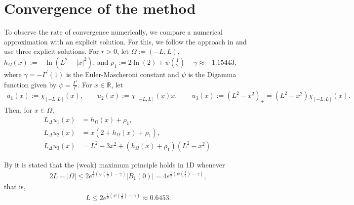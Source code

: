 \documentclass[11 pt]{article}
\numberwithin{equation}{section}
\def\R{\mathbb{R}}
\begin{document}
\section{Convergence of the method}

To observe the rate of convergence numerically, we compare a numerical approximation with an explicit solution. For this, we follow the approach in \cite{L22} and use three explicit solutions. For $r>0$, let  $\Omega:=(-L,L)$, $h_\Omega(x):=-\ln(L^2-|x|^2)$, and $\rho_1:=2 \ln (2)+\psi\left(\frac{1}{2}\right)-\gamma\approx -1.15443$, where $\gamma=-\Gamma^{\prime}(1)$ is the Euler-Mascheroni constant and $\psi$ is the Digamma function given by $\psi=\frac{\Gamma^{\prime}}{\Gamma}$.  For $x\in\R$, let 
\begin{align*}
u_1(x):=\chi_{[-L,L]}(x), \qquad
u_2(x):=\chi_{[-L,L]}(x) x, \qquad
u_3(x):=(L^2-x^2)_+=(L^2-x^2)\chi_{[-L,L]}(x).
\end{align*}
Then, for $x\in \Omega$,
\begin{align*}
    L_\Delta u_1(x)&=h_\Omega(x)+\rho_1,\\
    L_\Delta u_2(x)&=x(2+h_\Omega(x)+\rho_1),\\
    L_\Delta u_3(x)&=L^2-3x^2+(h_\Omega(x)+\rho_1)(L^2-x^2).
\end{align*}

By \cite[Corollary 1.9]{CW19} it is stated that the (weak) maximum principle holds in 1D whenever 
\begin{align*}
    2L=|\Omega|\leq 2 e^{\frac{1}{2}(\psi(\frac{1}{2})-\gamma)}|B_1(0)|=4e^{\frac{1}{2}(\psi(\frac{1}{2})-\gamma)},
    \end{align*}
    that is,
    \begin{align*}
        L\leq 2 e^{\frac{1}{2}(\psi(\frac{1}{2})-\gamma)}\approx 0.6453.
\end{align*}



\appendix
\end{document}
